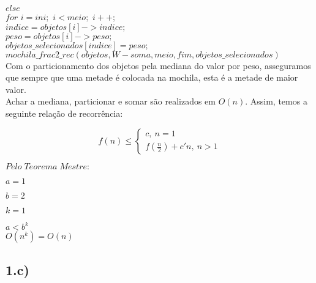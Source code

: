 \documentclass[10pt,a4paper]{article}
\begin{document}
	\hspace{1cm}$else$\\
	
	\hspace{2cm}$for$ $i=ini;$ $i<meio;$ $i++;$\\
	
	\hspace{3cm}$indice = objetos[i]->indice;$\\
	
	\hspace{3cm}$peso = objetos[i]->peso;$\\
	
	\hspace{3cm}$objetos\_selecionados[indice] = peso;$\\
	
	\hspace{2cm}$mochila\_frac2\_rec(objetos,W - soma,meio,fim, objetos\_selecionados)$\\
	
	
	Com o particionamento dos objetos pela mediana do valor por peso, asseguramos que sempre que uma metade é colocada na mochila, esta é a metade de maior valor.\\
	
	Achar a mediana, particionar e somar são realizados em $O(n)$.
Assim, temos a seguinte relação de recorrência:

 \[
    f(n)\leqslant\left\{
                \begin{array}{ll}
                     c,\: n = 1\\
                  f(\frac{n}{2}) + c'n, \: n>1
                \end{array}
              \right.
    \]            
  
           
   $Pelo\; Teorema\; Mestre:$
   
	\hspace{1cm}$a = 1$
	
	\hspace{1cm}$b = 2$
	
	\hspace{1cm}$k = 1$
	
	\hspace{1cm}$a < b^{k}$\\

	
	\hspace{5cm}$O(n^{k}) = O(n)$

   \subsection*{1.c)}
   
\end{document}
